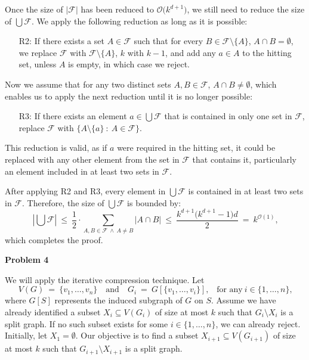 \documentclass[12pt]{article}
\begin{document}
	Once the size of \(|\mathcal{F}|\) has been reduced to
	\(\mathcal{O}\big(k^{d + 1}\big)\), we still need to reduce the size of
	\(\bigcup \mathcal{F}\). We apply the following reduction as long as it is
	possible:
	\begin{itemize}
		\item[R2:] If there exists a set \(A \in \mathcal{F}\) such that for
		           every \(B \in \mathcal{F} \setminus \{A\}\), \(A \cap B =
		           \emptyset\), we replace \(\mathcal{F}\) with \(\mathcal{F}
		           \setminus \{A\}\), \(k\) with \(k - 1\), and add any \(a \in
		           A\) to the hitting set, unless \(A\) is empty, in which case
		           we reject.
	\end{itemize}
	Now we assume that for any two distinct sets \(A, B \in \mathcal{F}\), \(A
	\cap B \neq \emptyset\), which enables us to apply the next reduction until
	it is no longer possible:
	\begin{itemize}
		\item[R3:] If there exists an element \(a \in \bigcup \mathcal{F}\) that
		           is contained in only one set in \(\mathcal{F}\), replace
		           \(\mathcal{F}\) with \(\{A \setminus \{a\} \ : \ A \in
		           \mathcal{F}\}\).
	\end{itemize}
	This reduction is valid, as if \(a\) were required in the hitting set, it
	could be replaced with any other element from the set in \(\mathcal{F}\)
	that contains it, particularly an element included in at least two sets in
	\(\mathcal{F}\).
	
	\medskip
	
	After applying R2 and R3, every element in \(\bigcup \mathcal{F}\) is
	contained in at least two sets in \(\mathcal{F}\). Therefore, the size of
	\(\bigcup \mathcal{F}\) is bounded by:
	\[ \left| \bigcup \mathcal{F} \right| \ \leqslant \ \frac{1}{2} \cdot
	\sum\limits_{A, B \in \mathcal{F} \ \wedge \ A \neq B} |A \cap B| \
	\leqslant \ \frac{k^{d + 1} \big(k^{d + 1} - 1\big)d}{2} \ = \
	k^{\mathcal{O}(1)} \text{,} \]
	which completes the proof.
	
	\bigskip
	
	\textbf{Problem 4}
	
	\medskip
	
	We will apply the iterative compression technique. Let
	\[ V(G) \ = \ \{v_{1}, \ldots, v_{n}\} \quad \text{and} \quad G_{i} \ = \
	G[\{v_{1}, \ldots, v_{i}\}] \text{,} \quad \text{for any} \ i \in \{1,
	\ldots, n\} \text{,} \]
	where \(G[S]\) represents the induced subgraph of \(G\) on \(S\). Assume we
	have already identified a subset \(X_{i} \subseteq V(G_{i})\) of size at
	most \(k\) such that \(G_{i} \setminus X_{i}\) is a split graph. If no such
	subset exists for some \(i \in \{1, \ldots, n\}\), we can already reject.
	Initially, let \(X_{1} = \emptyset\). Our objective is to find a subset
	\(X_{i + 1} \subseteq V(G_{i + 1})\) of size at most \(k\) such that
	\(G_{i + 1} \setminus X_{i + 1}\) is a split graph.
	
\end{document}
